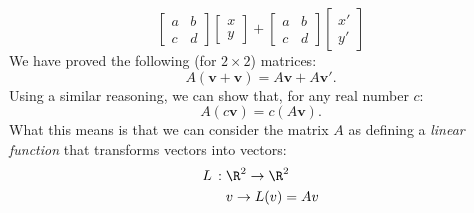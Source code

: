 \documentclass[12pt]{article}
\begin{document}
\[
\begin{bmatrix}a&b\\c&d\end{bmatrix}
\begin{bmatrix}x\\y\end{bmatrix} +
\begin{bmatrix}a&b\\c&d\end{bmatrix}
\begin{bmatrix}x'\\y'\end{bmatrix}
\]
We have proved the following (for $2\times 2$) matrices:
\[
A(\mathbf{v}+\mathbf{v})=A\mathbf{v}+A\mathbf{v}'.
\]
Using a similar reasoning, we can show that, for any real number $c$:
\[
A(c\mathbf{v})=c(A\mathbf{v}).
\]
What this means is that we can consider the matrix $A$ as defining a \emph{linear function} that transforms vectors into vectors:
\begin{align*}
L\,:\;&\R^2\to\R^2\\
&v \to L(v)=Av
\end{align*}
\end{document}
